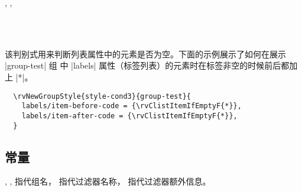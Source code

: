 \documentclass[full]{l3doc}
\begin{document}
\begin{documentation}
\begin{function}{\rvClistItemIfEmptyT, \rvClistItemIfEmptyF, \rvClistItemIfEmptyTF}
  \begin{syntax}
       \\
      \\
     
  \end{syntax}

  该判别式用来判断列表属性中的元素是否为空。下面的示例展示了如何在展示 |group-test| 组
  中 |labels| 属性（标签列表）的元素时在标签非空的时候前后都加上 |*|。
\end{function}

\begin{verbatim}
  \rvNewGroupStyle{style-cond3}{group-test}{
    labels/item-before-code = {\rvClistItemIfEmptyF{*}},
    labels/item-after-code = {\rvClistItemIfEmptyF{*}},
  }
\end{verbatim}

\subsection{常量}

\begin{function}{\rvGroup, \rvFilterName, \rvFilterInfo}
   指代组名， 指代过滤器名称，
  指代过滤器额外信息。
\end{function}

\end{documentation}

\end{document}
